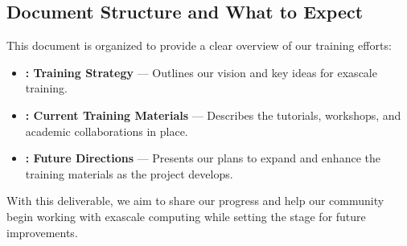 \subsection{Document Structure and What to Expect}

This document is organized to provide a clear overview of our training efforts:
\begin{itemize}
    \item \textbf{: Training Strategy} --- Outlines our vision and key ideas for exascale training.
    \item \textbf{: Current Training Materials} --- Describes the tutorials, workshops, and academic collaborations in place.
    \item \textbf{: Future Directions} --- Presents our plans to expand and enhance the training materials as the project develops.
\end{itemize}

With this deliverable, we aim to share our progress and help our community begin working with exascale computing while setting the stage for future improvements.